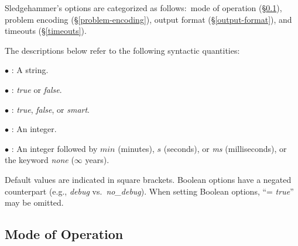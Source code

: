 \documentclass[a4paper,12pt]{article}
\begin{document}
Sledgehammer's options are categorized as follows:\ mode of operation
(\S\ref{mode-of-operation}), problem encoding (\S\ref{problem-encoding}), output
format (\S\ref{output-format}), and timeouts (\S\ref{timeouts}).

The descriptions below refer to the following syntactic quantities:

\begin{enum}
\item[$\bullet$] : A string.
\item[$\bullet$] : \textit{true} or \textit{false}.
\item[$\bullet$] : \textit{true}, \textit{false}, or \textit{smart}.
\item[$\bullet$] : An integer.
\item[$\bullet$] : An integer followed by $\textit{min}$ (minutes), $s$ (seconds), or \textit{ms}
(milliseconds), or the keyword \textit{none} ($\infty$ years).
\end{enum}

Default values are indicated in square brackets. Boolean options have a negated
counterpart (e.g., \textit{debug} vs.\ \textit{no\_debug}). When setting
Boolean options, ``= \textit{true}'' may be omitted.

\subsection{Mode of Operation}
\label{mode-of-operation}
\end{document}
